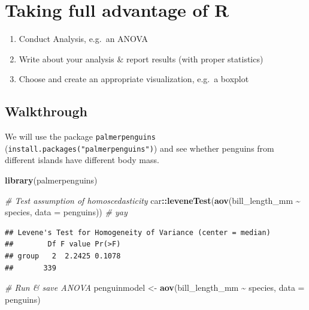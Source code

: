 \documentclass[
]{book}
\newenvironment{Shaded}{\begin{snugshade}}{\end{snugshade}}
\newcommand{\AttributeTok}[1]{\textcolor[rgb]{0.13,0.29,0.53}{#1}}
\newcommand{\CommentTok}[1]{\textcolor[rgb]{0.56,0.35,0.01}{\textit{#1}}}
\newcommand{\FunctionTok}[1]{\textcolor[rgb]{0.13,0.29,0.53}{\textbf{#1}}}
\newcommand{\NormalTok}[1]{#1}
\newcommand{\OtherTok}[1]{\textcolor[rgb]{0.56,0.35,0.01}{#1}}
\newcommand{\SpecialCharTok}[1]{\textcolor[rgb]{0.81,0.36,0.00}{\textbf{#1}}}
\providecommand{\tightlist}{%
  \setlength{\itemsep}{0pt}\setlength{\parskip}{0pt}}
\begin{document}
\section{Taking full advantage of R}\label{taking-full-advantage-of-r}

\begin{enumerate}
\def\labelenumi{\arabic{enumi}.}
\tightlist
\item
  Conduct Analysis, e.g.~an ANOVA
\item
  Write about your analysis \& report results (with proper statistics)
\item
  Choose and create an appropriate visualization, e.g.~a boxplot
\end{enumerate}

\subsection{Walkthrough}\label{walkthrough}

We will use the package \texttt{palmerpenguins} (\texttt{install.packages("palmerpenguins")}) and see whether penguins from different islands have different body mass.

\begin{Shaded}
\begin{Highlighting}[]
\FunctionTok{library}\NormalTok{(palmerpenguins)}

\CommentTok{\# Test assumption of homoscedasticity}
\NormalTok{car}\SpecialCharTok{::}\FunctionTok{leveneTest}\NormalTok{(}\FunctionTok{aov}\NormalTok{(bill\_length\_mm }\SpecialCharTok{\textasciitilde{}}\NormalTok{ species, }\AttributeTok{data =}\NormalTok{ penguins)) }\CommentTok{\# yay}
\end{Highlighting}
\end{Shaded}

\begin{verbatim}
## Levene's Test for Homogeneity of Variance (center = median)
##        Df F value Pr(>F)
## group   2  2.2425 0.1078
##       339
\end{verbatim}

\begin{Shaded}
\begin{Highlighting}[]
\CommentTok{\# Run \& save ANOVA}
\NormalTok{penguinmodel }\OtherTok{\textless{}{-}} \FunctionTok{aov}\NormalTok{(bill\_length\_mm }\SpecialCharTok{\textasciitilde{}}\NormalTok{ species, }\AttributeTok{data =}\NormalTok{ penguins)}
\end{Highlighting}
\end{Shaded}
\end{document}
